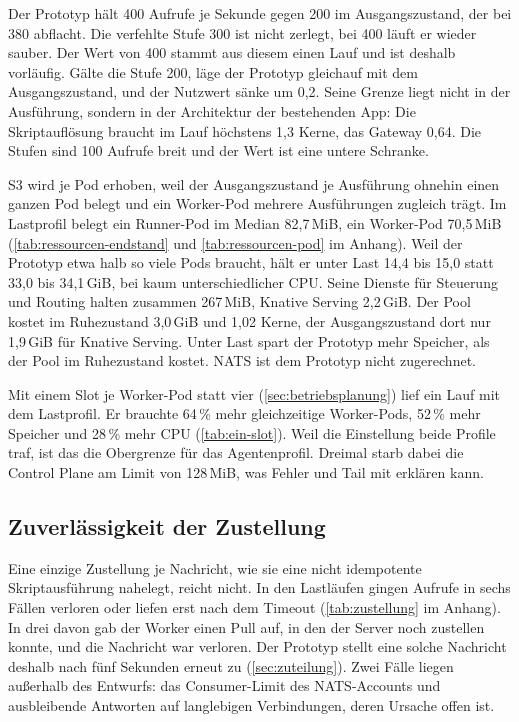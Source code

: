 Der Prototyp hält 400 Aufrufe je Sekunde gegen 200 im Ausgangszustand, der bei 380 abflacht. Die verfehlte Stufe 300 ist nicht zerlegt, bei 400 läuft er
wieder sauber.
Der Wert von 400 stammt aus diesem einen Lauf und ist deshalb vorläufig. Gälte die Stufe 200, läge der Prototyp gleichauf
mit dem Ausgangszustand, und der Nutzwert sänke um 0,2. Seine Grenze liegt nicht in der Ausführung, sondern in der Architektur der
bestehenden App: Die Skriptauflösung braucht im Lauf höchstens 1,3 Kerne, das Gateway 0,64. Die Stufen sind 100 Aufrufe
breit und der Wert ist eine untere Schranke.

S3 wird je Pod erhoben, weil der Ausgangszustand je Ausführung ohnehin einen ganzen Pod belegt und ein Worker-Pod
mehrere Ausführungen zugleich trägt. Im Lastprofil belegt ein Runner-Pod im Median 82,7\,MiB, ein Worker-Pod 70,5\,MiB
(\autoref{tab:ressourcen-endstand} und \autoref{tab:ressourcen-pod} im Anhang). Weil der Prototyp etwa halb so viele Pods
braucht, hält er unter Last 14,4 bis 15,0 statt 33,0 bis 34,1\,GiB, bei kaum unterschiedlicher \ac{CPU}. Seine Dienste für Steuerung
und Routing halten zusammen 267\,MiB, Knative Serving 2,2\,GiB. Der Pool kostet im Ruhezustand 3,0\,GiB und 1,02 Kerne, der Ausgangszustand dort
nur 1,9\,GiB für Knative Serving. Unter Last spart der Prototyp mehr Speicher, als der Pool im Ruhezustand kostet. NATS
ist dem Prototyp nicht zugerechnet.

Mit einem Slot je Worker-Pod statt vier (\autoref{sec:betriebsplanung}) lief ein Lauf mit dem
Lastprofil. Er brauchte 64\,\% mehr gleichzeitige Worker-Pods, 52\,\% mehr Speicher und 28\,\% mehr \ac{CPU}
(\autoref{tab:ein-slot}). Weil die Einstellung beide Profile traf, ist das die Obergrenze für das Agentenprofil. Dreimal starb dabei die Control Plane am Limit von 128\,MiB, was Fehler und Tail mit erklären kann.

\subsection{Zuverlässigkeit der Zustellung}
\label{sec:zuverlaessigkeit}

Eine einzige Zustellung je Nachricht, wie sie eine nicht idempotente Skriptausführung nahelegt, reicht nicht. In den
Lastläufen gingen Aufrufe in sechs Fällen verloren oder liefen erst nach dem Timeout (\autoref{tab:zustellung} im
Anhang). In drei davon gab der Worker einen Pull auf, in den der Server noch zustellen konnte, und die Nachricht war
verloren. Der Prototyp stellt eine solche Nachricht deshalb nach fünf Sekunden erneut zu (\autoref{sec:zuteilung}).
Zwei Fälle liegen außerhalb des Entwurfs: das Consumer-Limit des NATS-Accounts und ausbleibende Antworten auf
langlebigen Verbindungen, deren Ursache offen ist.

